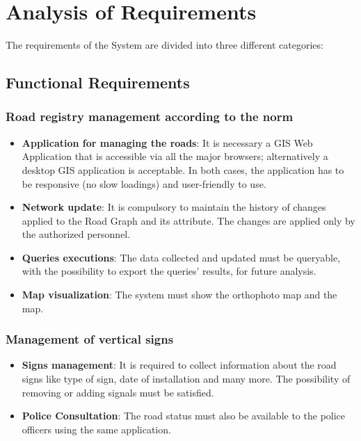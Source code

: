 \section{Analysis of Requirements}

The requirements of the System are divided into three different categories:

\subsection{Functional Requirements}
    \subsubsection{\textbf{Road registry management according to the norm}} 
    \begin{itemize}
    \item \textbf{Application for managing the roads}: It is necessary a GIS Web Application that is accessible via all the major browsers; alternatively a desktop GIS application is acceptable.
    In both cases, the application has to be responsive (no slow loadings) and user-friendly to use.
    \item \textbf{Network update}: It is compulsory to maintain the history of changes applied to the Road Graph and its attribute. The changes are applied only by the authorized personnel.
    \item \textbf{Queries executions}: The data collected and updated must be queryable, with the possibility to export the queries' results, for future analysis.
    \item \textbf{Map visualization}: The system must show the orthophoto map and the map.
    \end{itemize}

    
    \subsubsection{Management of vertical signs}
    \begin{itemize}
    \item \textbf{Signs management}: It is required to collect information about the road signs like type of sign, date of installation and many more. The possibility of removing or adding signals must be satisfied.
    \item \textbf{Police Consultation}: The road status must also be available to the police officers using the same application.
    \end{itemize}


